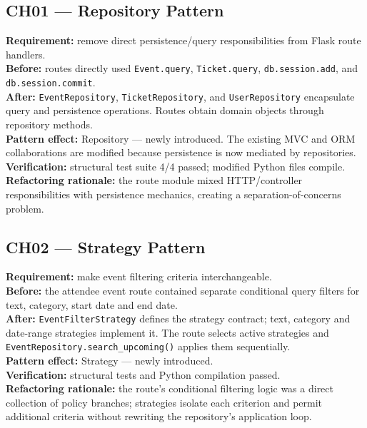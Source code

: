 \documentclass[11pt,a4paper]{article}
\begin{document}
\subsection{CH01 --- Repository Pattern}
\textbf{Requirement:} remove direct persistence/query responsibilities from Flask route handlers.\\
\textbf{Before:} routes directly used \texttt{Event.query}, \texttt{Ticket.query}, \texttt{db.session.add}, and \texttt{db.session.commit}.\\
\textbf{After:} \texttt{EventRepository}, \texttt{TicketRepository}, and \texttt{UserRepository} encapsulate query and persistence operations. Routes obtain domain objects through repository methods.\\
\textbf{Pattern effect:} Repository --- newly introduced. The existing MVC and ORM collaborations are modified because persistence is now mediated by repositories.\\
\textbf{Verification:} structural test suite 4/4 passed; modified Python files compile.\\
\textbf{Refactoring rationale:} the route module mixed HTTP/controller responsibilities with persistence mechanics, creating a separation-of-concerns problem.

\subsection{CH02 --- Strategy Pattern}
\textbf{Requirement:} make event filtering criteria interchangeable.\\
\textbf{Before:} the attendee event route contained separate conditional query filters for text, category, start date and end date.\\
\textbf{After:} \texttt{EventFilterStrategy} defines the strategy contract; text, category and date-range strategies implement it. The route selects active strategies and \texttt{EventRepository.search\_upcoming()} applies them sequentially.\\
\textbf{Pattern effect:} Strategy --- newly introduced.\\
\textbf{Verification:} structural tests and Python compilation passed.\\
\textbf{Refactoring rationale:} the route's conditional filtering logic was a direct collection of policy branches; strategies isolate each criterion and permit additional criteria without rewriting the repository's application loop.
\end{document}
